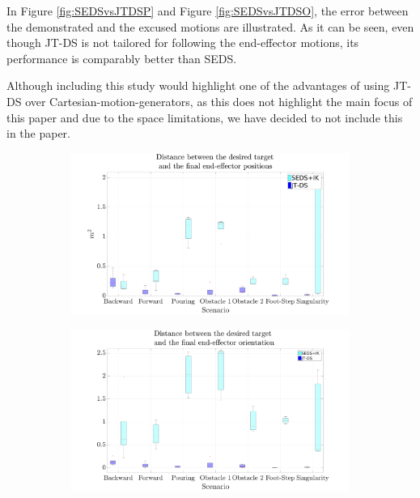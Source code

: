 \documentclass{article}
\begin{document}
\begin{enumerate}
In Figure \ref{fig:SEDSvsJTDSP} and Figure \ref{fig:SEDSvsJTDSO}, the error between the demonstrated and the excused motions are illustrated. As it can be seen, even though JT-DS is not tailored for following the end-effector motions, its performance is comparably better than SEDS.

Although including this study would highlight one of the advantages of using JT-DS over Cartesian-motion-generators, as this does not highlight the main focus of this paper and due to the space limitations, we have decided to not include this in the paper.

\begin{figure}[!t]
 \hspace*{-2.4cm}
	\begin{subfigure}[t]{0.63\linewidth}
	\centering
		\includegraphics[trim={2cm 0.0cm 3.25cm 0cm},clip,width=\textwidth]{Pics/SEDS_JT_P_End.pdf}
		\caption{}
		\label{fig:SEDSvsJTDSP:E}
	\end{subfigure}%
	\hspace{-0.2cm}
	\begin{subfigure}[t]{0.63\linewidth}
	\centering
		\includegraphics[trim={2cm 0.0cm 3.25cm 0cm},clip,width=\textwidth]{Pics/SEDS_JT_O_End.pdf}

\end{subfigure}
\end{figure}
\end{enumerate}
\end{document}
